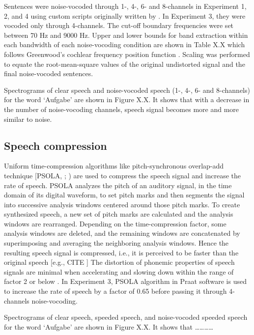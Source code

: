\documentclass[a4paper, nobind]{templates/ociamthesis}
\begin{document}
Sentences were noise-vocoded through 1-, 4-, 6- and 8-channels in Experiment 1, 2, and 4 using custom scripts originally written by \textcite{Darwin2005}.
In Experiment 3, they were vocoded only through 4-channels.
The cut-off boundary frequencies were set between 70 Hz and 9000 Hz.
Upper and lower bounds for band extraction within each bandwidth of each noise-vocoding condition are shown in Table X.X which follows Greenwood's cochlear frequency position function \autocite{Greenwood1990,Erb2014}.
Scaling was performed to equate the root-mean-square values of the original undistorted signal and the final noise-vocoded sentences.

Spectrograms of clear speech and noise-vocoded speech (1-, 4-, 6- and 8-channels) for the word `Aufgabe' are shown in Figure X.X. It shows that with a decrease in the number of noise-vocoding channels, speech signal becomes more and more similar to noise.

\hypertarget{speech-compression}{%
\subsection{Speech compression}\label{speech-compression}}

Uniform time-compression algorithms like pitch-synchronous overlap-add technique {[}PSOLA, \textcite{Charpentier1986}; \textcite{Moulines1990}) are used to compress the speech signal and increase the rate of speech.
PSOLA analyzes the pitch of an auditory signal, in the time domain of its digital waveform, to set pitch marks and then segments the signal into successive analysis windows centered around those pitch marks.
To create synthesized speech, a new set of pitch marks are calculated and the analysis windows are rearranged.
Depending on the time-compression factor, some analysis windows are deleted, and the remaining windows are concatenated by superimposing and averaging the neighboring analysis windows.
Hence the resulting speech signal is compressed, i.e., it is perceived to be faster than the original speech {[}e.g., CITE {]}
The distortion of phonemic properties of speech signals are minimal when accelerating and slowing down within the range of factor 2 or below \autocite{Moulines1990}.
In Experiment 3, PSOLA algorithm in Praat software is used to increase the rate of speech by a factor of 0.65 before passing it through 4-channels noise-vocoding.

Spectrograms of clear speech, speeded speech, and noise-vocoded speeded speech for the word `Aufgabe' are shown in Figure X.X. It shows that \ldots\ldots\ldots\ldots{}
\end{document}
